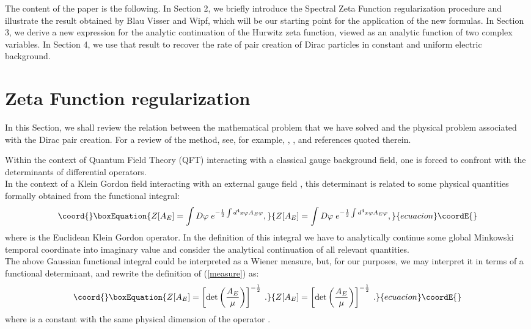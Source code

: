 \documentclass [11pt]{article}
\def\phi{\varphi}
\begin{document}
The content of the paper is the following. In   Section 2, we  briefly 
introduce the Spectral Zeta Function regularization procedure and illustrate 
the result obtained by Blau Visser and Wipf, which will be our 
starting point for the application of the new formulas. In  Section 3,
  we derive a new expression for the analytic continuation of the Hurwitz 
zeta function,
viewed as an analytic function of two complex variables. In Section 4, we
use that result to recover the rate of pair creation of Dirac particles in 
constant and uniform electric
background.

\section{Zeta Function regularization}

In this  Section, we shall review  
the relation between the mathematical problem that we have
solved and the physical problem associated with the  Dirac pair creation.
For a review of  the method, see, for example,
 \cite{7}, \cite{Moretti:1999rf}, \cite{Bytsenko:1996bc} and references quoted therein.

Within the context of Quantum Field Theory (QFT) interacting with a classical gauge background field, one is forced to confront with the determinants of 
differential operators.\\
In the context of a Klein Gordon field interacting with an external gauge field \coordHE{}, 
this determinant is related to some physical quantities formally obtained from the \coordHE{} functional integral:
\begin{equation}\coord{}\boxEquation{
\label{measure}
Z[A_E]=\int D\phi \; e^{-\frac{1}{2} \int d^{4}x \phi A_E \phi},
}{
Z[A_E]=\int D\phi \; e^{-\frac{1}{2} \int d^{4}x \phi A_E \phi},
}{ecuacion}\coordE{}\end{equation}
where \coordHE{} is the Euclidean Klein Gordon operator.
In the definition of this integral we have to analytically continue some global Minkowski temporal coordinate \coordHE{}  into imaginary value \coordHE{} and consider the analytical continuation of all relevant quantities. \\
The above Gaussian functional integral could be interpreted as a Wiener
 measure, but, 
for our purposes, we may  interpret it in terms of a functional determinant, and rewrite the 
definition of (\ref{measure}) as:
\begin{equation}\coord{}\boxEquation{
Z[A_{E}]=\left[ \mbox{det} \left( \frac{A_{E}}{\mu} \right) \right]^{-\frac{1}{2}} \: .
}{
Z[A_{E}]=\left[ \mbox{det} \left( \frac{A_{E}}{\mu} \right) \right]^{-\frac{1}{2}} \: .
}{ecuacion}\coordE{}\end{equation}
where \myHighlight{$\mu$}\coordHE{} is a constant with the same physical dimension of the operator \coordHE{}.
\end{document}
